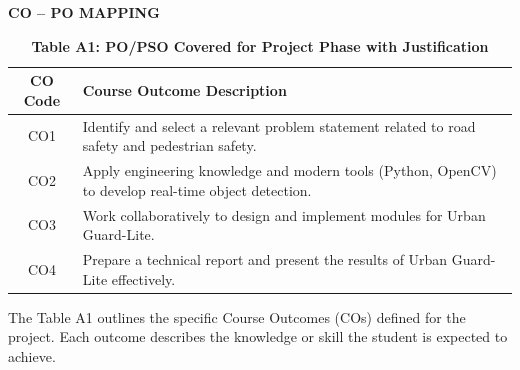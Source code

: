 \documentclass[a4paper, 12pt]{report}
\begin{document}
\newpage


\vspace*{0.3cm} %

\begin{center}
{\LARGE \textbf{CO -- PO MAPPING}}
\end{center}

{}



\setlength{\extrarowheight}{6pt} %



\begin{table}[htbp]
\centering
\caption*{\textbf{Table A1: PO/PSO Covered for Project Phase with Justification}} %
\renewcommand{\arraystretch}{1.3}
\begin{tabular}{|c|p{12cm}|}
\hline
\textbf{CO Code} & \textbf{Course Outcome Description} \\ \hline

CO1 & Identify and select a relevant problem statement related to road safety and pedestrian safety. \\ \hline

CO2 & Apply engineering knowledge and modern tools (Python, OpenCV) to develop real-time object detection. \\ \hline

CO3 & Work collaboratively to design and implement modules for Urban Guard-Lite. \\ \hline

CO4 & Prepare a technical report and present the results of Urban Guard-Lite effectively. \\ \hline
\end{tabular}
\end{table}

The Table A1 outlines the specific Course Outcomes (COs) defined for the project.
Each outcome describes the knowledge or skill the student is expected to achieve.

\end{document}
